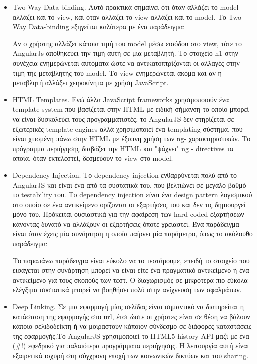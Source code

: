 	\begin{itemize}
	\item Two Way Data-binding. Αυτό πρακτικά σημαίνει ότι όταν αλλάζει το model αλλάζει και το view, και όταν αλλάζει το  view αλλάζει και το model.  Το Two Way Data-binding εξηγείται καλύτερα με ένα παράδειγμα: 
	
	
	

	Αν ο χρήστης αλλάζει κάποια τιμή του model μέσω εισόδου στο view, τότε το AngularJs αποθηκεύει την τιμή
αυτή σε μια μεταβλητή. Το στοιχείο h1 στην συνέχεια ενημερώνεται αυτόματα ώστε να αντικατοπτρίζονται οι αλλαγές στην τιμή της μεταβλητής του model. Το view ενημερώνεται ακόμα και αν η μεταβλητή αλλάξει χειροκίνητα με χρήση JavaScript.\cite{angular}

	\item  HTML Templates. Ενώ άλλα JavaScript frameworks χρησιμοποιούν ένα template system που βασίζεται στην HTML με ειδική σήμανση το οποίο μπορεί να είναι δυσκολεύει τους προγραμματιστές, το AngularJS δεν στηρίζεται σε εξωτερικές template engines αλλά χρησιμοποιεί ένα templating σύστημα, που είναι χτισμένη πάνω στην HTML με έξυπνη χρήση των ng- χαρακτηριστικών. Το πρόγραμμα περιήγησης διαβάζει την HTML και "ψάχνει"  ng - directives τα οποία, όταν εκτελεστεί, δεσμεύουν το view στο model.

    \item Dependency Injection. Το dependency injection ενθαρρύνεται πολύ από το AngularJS και είναι ένα από τα συστατικά του, που βελτιώνει σε μεγάλο βαθμό το testability του. Το dependency injection είναι ένα design pattern λογισμικού στο οποίο σε ένα αντικείμενο ορίζονται οι εξαρτήσεις του και δεν τις δημιουργεί μόνο του. Πρόκειται ουσιαστικά για την αφαίρεση των hard-coded εξαρτήσεων κάνοντας δυνατό να αλλάξουν οι εξαρτήσεις όποτε χρειαστεί.
      Ένα παράδειγμα είναι όταν έχεις μία συνάρτηση η οποία παίρνει μία παράμετρο, όπως το ακόλουθο παράδειγμα:
    	
	

Το παραπάνω παράδειγμα είναι εύκολο να το τεστάρουμε, επειδή το στοιχείο που εισάγεται στην συνάρτηση μπορεί να είναι είτε ένα πραγματικό αντικείμενο ή ένα αντικείμενο για τους σκοπούς των τεστ. Ο διαχωρισμός σε μικρότερα πιο εύκολα ελέγξιμα συστατικά μπορεί να βοηθήσει πολύ στην ανίχνευση των σφαλμάτων.

    \item Deep Linking. Σε μια εφαρμογή μίας σελίδας είναι σημαντικό να διατηρείται η κατάσταση της εφαρμογής στο url, έτσι ώστε οι χρήστες είναι σε θέση να βάλουν κάποιο σελιδοδείκτη ή να μοιραστούν κάποιον σύνδεσμο σε διάφορες καταστάσεις της εφαρμογής.Το AngularJS χρησιμοποιεί το HTML5 history API  μαζί με ένα (\#!) εφεδρικό για παλαιότερα προγράμματα περιήγησης. Η λειτουργία αυτή είναι εξαιρετικά ισχυρή στη σύγχρονη εποχή των κοινωνικών δικτύων και του sharing.


\end{itemize}
